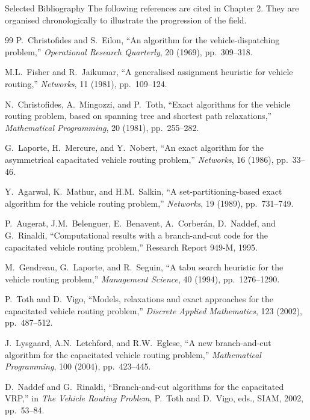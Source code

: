 \documentclass[aspectratio=169,10pt]{beamer}
\begin{document}
\begin{frame}[allowframebreaks]{Selected Bibliography}
  The following references are cited in Chapter 2. They are organised
  chronologically to illustrate the progression of the field.

  \begin{thebibliography}{99}
      P.~Christofides and S.~Eilon, ``An algorithm for the vehicle-dispatching
      problem,'' \textit{Operational Research Quarterly}, 20 (1969), pp.~309--318.

      M.L.~Fisher and R.~Jaikumar, ``A generalised assignment heuristic for
      vehicle routing,'' \textit{Networks}, 11 (1981), pp.~109--124.

      N.~Christofides, A.~Mingozzi, and P.~Toth, ``Exact algorithms for the
      vehicle routing problem, based on spanning tree and shortest path
      relaxations,'' \textit{Mathematical Programming}, 20 (1981), pp.~255--282.

      G.~Laporte, H.~Mercure, and Y.~Nobert, ``An exact algorithm for the
      asymmetrical capacitated vehicle routing problem,'' \textit{Networks},
      16 (1986), pp.~33--46.

      Y.~Agarwal, K.~Mathur, and H.M.~Salkin, ``A set-partitioning-based exact
      algorithm for the vehicle routing problem,'' \textit{Networks}, 19 (1989),
      pp.~731--749.

      P.~Augerat, J.M.~Belenguer, E.~Benavent, A.~Corber\'an, D.~Naddef,
      and G.~Rinaldi, ``Computational results with a branch-and-cut code for
      the capacitated vehicle routing problem,'' Research Report 949-M, 1995.

      M.~Gendreau, G.~Laporte, and R.~Seguin, ``A tabu search heuristic for
      the vehicle routing problem,'' \textit{Management Science}, 40 (1994),
      pp.~1276--1290.

      P.~Toth and D.~Vigo, ``Models, relaxations and exact approaches for the
      capacitated vehicle routing problem,'' \textit{Discrete Applied Mathematics},
      123 (2002), pp.~487--512.

      J.~Lysgaard, A.N.~Letchford, and R.W.~Eglese, ``A new branch-and-cut
      algorithm for the capacitated vehicle routing problem,''
      \textit{Mathematical Programming}, 100 (2004), pp.~423--445.

      D.~Naddef and G.~Rinaldi, ``Branch-and-cut algorithms for the capacitated
      VRP,'' in \textit{The Vehicle Routing Problem}, P.~Toth and D.~Vigo, eds.,
      SIAM, 2002, pp.~53--84.


\end{thebibliography}
\end{frame}
\end{document}
